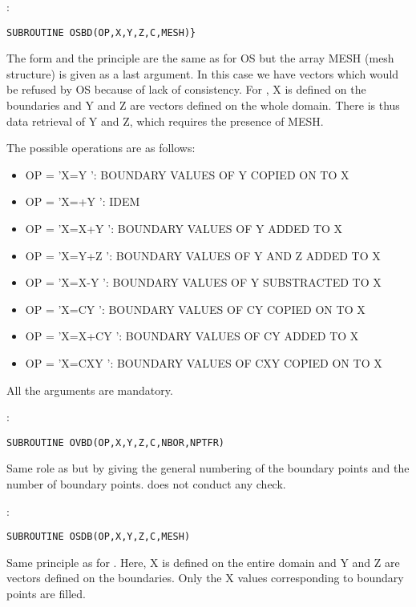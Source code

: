 :
\begin{lstlisting}[language=TelFortran]
SUBROUTINE OSBD(OP,X,Y,Z,C,MESH)}
\end{lstlisting}

The form and the principle are the same as for OS but the array MESH (mesh
structure) is given as a last argument. In this case we have vectors which
would be refused by OS because of lack of consistency. For , X is defined
on the boundaries and Y and Z are vectors defined on the whole domain. There is
thus data retrieval of Y and Z, which requires the presence of MESH.

The possible operations are as follows:
\begin{itemize}
  \item OP = 'X=Y     ':  BOUNDARY VALUES OF Y COPIED ON TO X
  \item OP = 'X=+Y    ':  IDEM
  \item OP = 'X=X+Y   ':  BOUNDARY VALUES OF Y ADDED TO X
  \item OP = 'X=Y+Z   ':  BOUNDARY VALUES OF Y AND Z ADDED TO X
  \item OP = 'X=X-Y   ':  BOUNDARY VALUES OF Y SUBSTRACTED TO X
  \item OP = 'X=CY    ':  BOUNDARY VALUES OF CY COPIED ON TO X
  \item OP = 'X=X+CY  ':  BOUNDARY VALUES OF CY ADDED TO X
  \item OP = 'X=CXY   ':  BOUNDARY VALUES OF CXY COPIED ON TO X
\end{itemize}

All the arguments are mandatory.

:
\begin{lstlisting}[language=TelFortran]
SUBROUTINE OVBD(OP,X,Y,Z,C,NBOR,NPTFR)
\end{lstlisting}

Same role as  but by giving the general numbering of the boundary points
and the number of boundary points.  does not conduct any check.

:
\begin{lstlisting}[language=TelFortran]
SUBROUTINE OSDB(OP,X,Y,Z,C,MESH)
\end{lstlisting}

Same principle as for . Here, X is defined on the entire domain and Y and Z
are vectors defined on the boundaries. Only the X values corresponding to
boundary points are filled.

